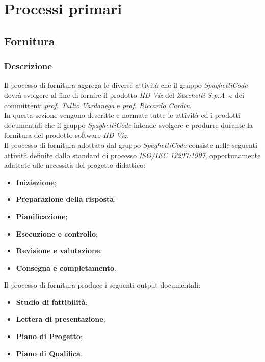 \section{Processi primari}
\label{sec:processi_primari}

\subsection{Fornitura}
\label{sub:fornitura}

\subsubsection{Descrizione}
Il processo di fornitura aggrega le diverse attività che il gruppo \emph{SpaghettiCode} dovrà svolgere al fine di fornire il prodotto \emph{HD Viz} del  \emph{Zucchetti S.p.A.} e dei committenti \emph{prof. Tullio Vardanega} e \emph{prof. Riccardo Cardin}.\\

In questa sezione vengono descritte e normate tutte le attività ed i prodotti documentali che il gruppo \emph{SpaghettiCode} intende svolgere e produrre durante la fornitura del prodotto software \emph{HD Viz}.\\

Il processo di fornitura adottato dal gruppo \emph{SpaghettiCode} consiste nelle seguenti attività definite dallo standard di processo \emph{ISO/IEC 12207:1997}, opportunamente adattate alle necessità del progetto didattico:
\begin{itemize}
    \item \textbf{Iniziazione};
    \item \textbf{Preparazione della risposta};
    \item \textbf{Pianificazione};
    \item \textbf{Esecuzione e controllo};
    \item \textbf{Revisione e valutazione};
    \item \textbf{Consegna e completamento}.
\end{itemize}

Il processo di fornitura produce i seguenti output documentali:
\begin{itemize}
    \item \textbf{Studio di fattibilità};
    \item \textbf{Lettera di presentazione};
	\item \textbf{Piano di Progetto};
	\item \textbf{Piano di Qualifica}.
\end{itemize}

